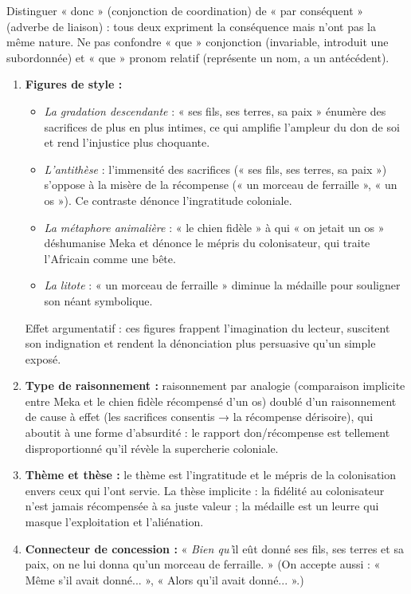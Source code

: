 \documentclass[11pt]{article}
\newcommand{\cle}[1]{{\popxbold\color{popdark}#1}}
\begin{document}
\begin{attention}
Distinguer « donc » (conjonction de coordination) de « par conséquent » (adverbe de liaison) : tous deux expriment la conséquence mais n'ont pas la même nature. Ne pas confondre « que » conjonction (invariable, introduit une subordonnée) et « que » pronom relatif (représente un nom, a un antécédent).
\end{attention}

\begin{corrige}
\begin{enumerate}
\item \textbf{Figures de style :}
\begin{itemize}
\item \emph{La gradation descendante} : « ses fils, ses terres, sa paix » énumère des sacrifices de plus en plus intimes, ce qui amplifie l'ampleur du don de soi et rend l'injustice plus choquante.
\item \emph{L'antithèse} : l'immensité des sacrifices (« ses fils, ses terres, sa paix ») s'oppose à la misère de la récompense (« un morceau de ferraille », « un os »). Ce contraste dénonce l'ingratitude coloniale.
\item \emph{La métaphore animalière} : « le chien fidèle » à qui « on jetait un os » déshumanise Meka et dénonce le mépris du colonisateur, qui traite l'Africain comme une bête.
\item \emph{La litote} : « un morceau de ferraille » diminue la médaille pour souligner son néant symbolique.
\end{itemize}
Effet argumentatif : ces figures frappent l'imagination du lecteur, suscitent son indignation et rendent la dénonciation plus persuasive qu'un simple exposé.
\item \textbf{Type de raisonnement :} raisonnement par \cle{analogie} (comparaison implicite entre Meka et le chien fidèle récompensé d'un os) doublé d'un raisonnement de \cle{cause à effet} (les sacrifices consentis → la récompense dérisoire), qui aboutit à une forme d'absurdité : le rapport don/récompense est tellement disproportionné qu'il révèle la supercherie coloniale.
\item \textbf{Thème et thèse :} le \cle{thème} est l'ingratitude et le mépris de la colonisation envers ceux qui l'ont servie. La \cle{thèse} implicite : la fidélité au colonisateur n'est jamais récompensée à sa juste valeur ; la médaille est un leurre qui masque l'exploitation et l'aliénation.
\item \textbf{Connecteur de concession :} « \emph{Bien qu'}il eût donné ses fils, ses terres et sa paix, on ne lui donna qu'un morceau de ferraille. » (On accepte aussi : « Même s'il avait donné... », « Alors qu'il avait donné... ».)
\end{enumerate}
\end{corrige}
\end{document}

